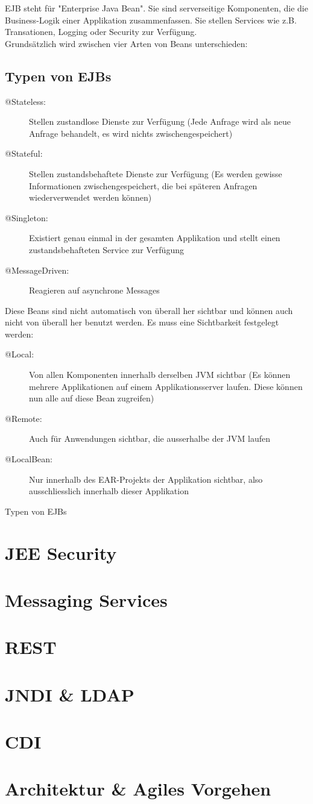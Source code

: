 \documentclass[a4paper, 11pt]{article}
\begin{document}
EJB steht für "Enterprise Java Bean". Sie sind serverseitige Komponenten, die die Business-Logik einer Applikation zusammenfassen. Sie  stellen Services wie z.B. Transationen, Logging oder Security zur Verfügung. \\
Grundsätzlich wird zwischen vier Arten von Beans unterschieden:

\subsection{Typen von EJBs}
\begin{description}
    \item[@Stateless: ] Stellen zustandlose Dienste zur Verfügung (Jede Anfrage wird als neue Anfrage behandelt, es wird nichts zwischengespeichert)
    \item[@Stateful: ] Stellen zustandsbehaftete Dienste zur Verfügung (Es werden gewisse Informationen zwischengespeichert, die bei späteren Anfragen wiederverwendet werden können)
    \item[@Singleton: ] Existiert genau einmal in der gesamten Applikation und stellt einen zustandsbehafteten Service zur Verfügung
    \item[@MessageDriven: ] Reagieren auf asynchrone Messages
\end{description}

Diese Beans sind nicht automatisch von überall her sichtbar und können auch nicht von überall her benutzt werden. Es muss eine Sichtbarkeit festgelegt werden:

\begin{description}
    \item[@Local: ] Von allen Komponenten innerhalb derselben JVM sichtbar (Es können mehrere Applikationen auf einem Applikationsserver laufen. Diese können nun alle auf diese Bean zugreifen)
    \item[@Remote: ] Auch für Anwendungen sichtbar, die ausserhalbe der JVM laufen
    \item[@LocalBean: ] Nur innerhalb des EAR-Projekts der Applikation sichtbar, also ausschliesslich innerhalb dieser Applikation
\end{description}
Typen von EJBs


\section{JEE Security}

\section{Messaging Services}

\section{REST}

\section{JNDI \& LDAP}

\section{CDI}

\section{Architektur \& Agiles Vorgehen}
\end{document}

